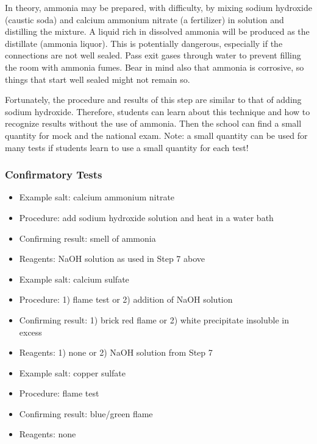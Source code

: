 In theory, 
ammonia may be prepared, 
with difficulty, 
by mixing sodium hydroxide (caustic soda) 
and calcium ammonium nitrate (a fertilizer) in solution 
and distilling the mixture. 
A liquid rich in dissolved ammonia will be produced 
as the distillate (ammonia liquor). 
This is potentially dangerous, 
especially if the connections are not well sealed. 
Pass exit gases through water to prevent filling the room 
with ammonia fumes. 
Bear in mind also that ammonia is corrosive, 
so things that start well sealed might not remain so. 

Fortunately, 
the procedure and results of this step are similar 
to that of adding sodium hydroxide. 
Therefore, 
students can learn about this technique 
and how to recognize results without the use of ammonia. 
Then the school can find a small quantity for mock and the national exam.
Note: a small quantity can be used for many tests 
if students learn to use a small quantity for each test!

\subsubsection{Confirmatory Tests}


\begin{itemize}
\item{Example salt: calcium ammonium nitrate}
\item{Procedure: add sodium hydroxide solution and heat in a water bath}
\item{Confirming result: smell of ammonia} 
\item{Reagents: NaOH solution as used in Step 7 above}
\end{itemize}

\begin{itemize}
\item{Example salt: calcium sulfate}
\item{Procedure: 1) flame test or 2) addition of NaOH solution}
\item{Confirming result: 1) brick red flame 
or 2) white precipitate insoluble in excess}
\item{Reagents: 1) none or 2) NaOH solution from Step 7}
\end{itemize}

\begin{itemize}
\item{Example salt: copper sulfate}
\item{Procedure: flame test}
\item{Confirming result: blue/green flame}
\item{Reagents: none}
\end{itemize}

